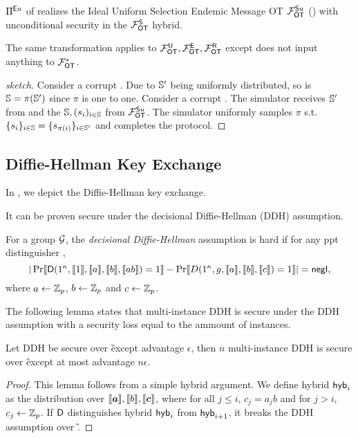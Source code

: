 \begin{lemma}
	$\Pi^{\mathsf{E} u}$ of  realizes the  Ideal Uniform Selection Endemic Message OT $\mathcal{F}_{\mathsf{OT}}^{\mathsf{S} u}$ () with unconditional security in the $\mathcal{F}_{\mathsf{OT}}^{\mathsf{S}}$ hybrid.
\end{lemma}

\begin{remark}
	The same transformation applies to $\mathcal{F}_{\mathsf{OT}}^\mathsf{U},\mathcal{F}_{\mathsf{OT}}^\mathsf{E}, \mathcal{F}_{\mathsf{OT}}^\mathsf{R}$ except \send does not input anything to $\mathcal{F}_{\mathsf{OT}}^*$.
\end{remark}
 

\begin{proof}[sketch]
	Consider a corrupt \send. Due to $\mathsf{\mathbb S}'$ being uniformly distributed, so is $\mathsf{\mathbb S}=\pi(\mathsf{\mathbb S}')$ since $\pi$ is one to one. Consider a corrupt \rec. The simulator receives $\mathsf{\mathbb S}'$ from \rec and the $\mathsf{\mathbb S},(s_i)_{i\in\mathsf{\mathbb S}}$ from $\mathcal{F}_{\mathsf{OT}}^{\mathsf{S} u}$. The simulator uniformly samples $\pi$ s.t. $\{s_i\}_{i\in\mathsf{\mathbb S}} =\{s_{\pi(i)}\}_{i\in\mathsf{\mathbb S}'}$ and completes the protocol.
	\pe
\end{proof}


\subsection{Diffie-Hellman Key Exchange}\label{sec:DDH}
In , we depict the Diffie-Hellman key exchange. 

It can be proven secure under the decisional Diffie-Hellman (DDH) assumption.
\begin{definition}
For a group $\mathcal{G}$, the \emph{decisional Diffie-Hellman} assumption is hard if for any ppt distinguisher \D,
$$
|\Pr\llbracket \mathsf D(1^\kappa,\llbracket 1\rrbracket,\llbracket a\rrbracket,\llbracket b\rrbracket,\llbracket ab\rrbracket)=1\rrbracket-\Pr\llbracket D(1^\kappa,g,\llbracket a\rrbracket,\llbracket b\rrbracket,\llbracket c\rrbracket)=1\rrbracket|=\mathsf{negl},
$$
where $a\leftarrow\mathbb Z_p$, $b\leftarrow\mathbb Z_p$ and $c\leftarrow\mathbb Z_p$.
\end{definition}

The following lemma states that multi-instance DDH is secure under the DDH assumption with a security loss equal to the ammount of instances.

\begin{lemma}\label{lem:DHuniform}
Let DDH be secure over \G except advantage $\epsilon$, then $n$ multi-instance DDH is secure over \G except at most advantage $n\epsilon$.
\end{lemma}

\begin{proof}
This lemma follows from a simple hybrid argument. We define hybrid $\mathsf{hyb}_i$ as the distribution over $\lb \vec{a}\rb,\lb b\rb,\lb \vec{c}\rb$, where for all $j\leq i$, $c_j=a_jb$ and for $j>i$, $c_j\leftarrow\mathbb Z_p$. If $\mathsf D$ distinguishes hybrid $\mathsf{hyb}_i$ from $\mathsf{hyb}_{i+1}$, it breaks the DDH assumption over \G.
\pe
\end{proof}

